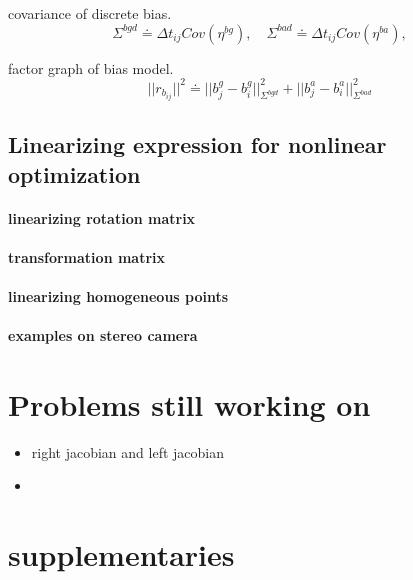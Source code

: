 \documentclass[10pt,a4paper]{article}
\begin{document}
covariance of discrete bias.
\begin{equation}
\Sigma^{bgd} \doteq \Delta t_{ij} Cov(\eta^{bg}), \quad \Sigma^{bad} \doteq \Delta t_{ij} Cov(\eta^{ba}),
\end{equation}

factor graph of bias model.
\begin{equation}
||r_{b_{ij}} ||^2 \doteq ||b_j^g - b_i^g||_{\Sigma^{bgd}}^2 + ||b_j^a - b_i^a||_{\Sigma^{bad}}^2
\end{equation}

\subsection{Linearizing expression for nonlinear optimization}
\paragraph{linearizing rotation matrix}
\paragraph{transformation matrix}
\paragraph{linearizing homogeneous points}
\paragraph{examples on stereo camera}

\section{Problems still working on}
\begin{itemize}
	\item right jacobian and left jacobian
	\item 
\end{itemize}



\section{supplementaries}
\end{document}

